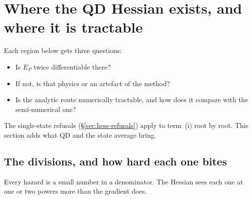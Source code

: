 \documentclass[11pt]{article}
\begin{document}
\section{Where the QD Hessian exists, and where it is tractable}
\label{sec:qd-diff}

Each region below gets three questions:
\begin{itemize}
\item Is $E_P$ twice differentiable there?
\item If not, is that physics or an artefact of the method?
\item Is the analytic route numerically tractable, and how does it compare
  with the semi-numerical one?
\end{itemize}
The single-state refusals (\S\ref{sec:hess-refusals}) apply to term~(i)
root by root. This section adds what QD and the state average bring.

\subsection{The divisions, and how hard each one bites}

Every hazard is a small number in a denominator. The Hessian sees each
one at one or two powers more than the gradient does.
\end{document}
